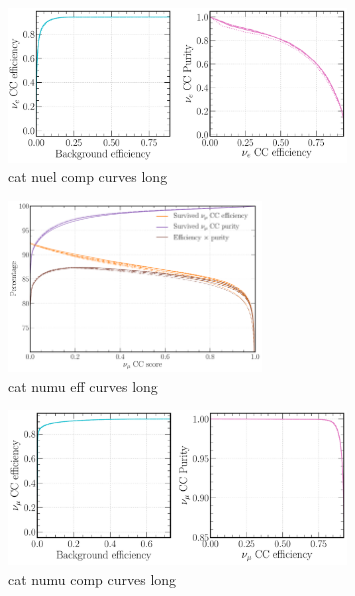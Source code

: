 \begin{figure} %
    \includegraphics[width=0.8\textwidth]{diagrams/7-cvn/chipsnet/cat_nuel_comp_curves.pdf}
    \caption[cat nuel comp curves short]
    {cat nuel comp curves long}
    \label{fig:cat_nuel_comp_curves}
\end{figure}

\begin{figure} %
    \includegraphics[width=0.6\textwidth]{diagrams/7-cvn/chipsnet/cat_numu_eff_curves.pdf}
    \caption[cat numu eff curves short]
    {cat numu eff curves long}
    \label{fig:cat_numu_eff_curves}
\end{figure}

\begin{figure} %
    \includegraphics[width=0.8\textwidth]{diagrams/7-cvn/chipsnet/cat_numu_comp_curves.pdf}
    \caption[cat numu comp curves short]
    {cat numu comp curves long}
    \label{fig:cat_numu_comp_curves}
\end{figure}

